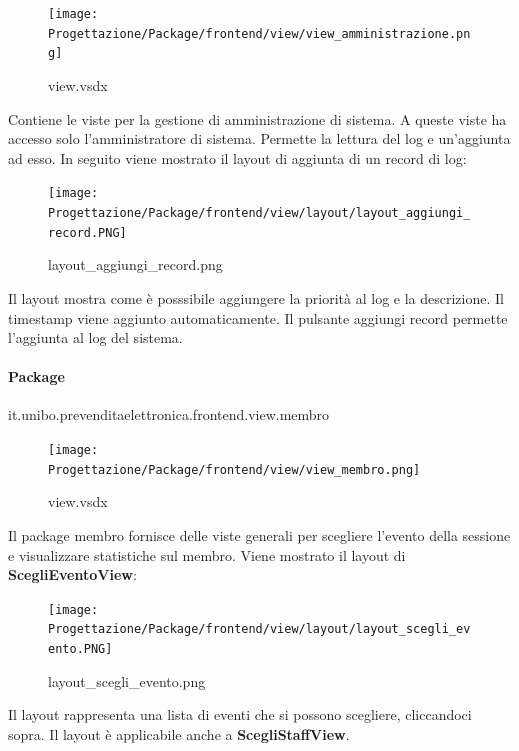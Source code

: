 \documentclass[a4paper]{article}
\begin{document}

\begin{figure}[H]
    \texttt{[image: Progettazione/Package/frontend/view/view\_amministrazione.png]}
    \centering
    \caption{view.vsdx}
\end{figure}

Contiene le viste per la gestione di amministrazione di sistema. A queste viste ha accesso solo l'amministratore di sistema. Permette la lettura del log e un'aggiunta ad esso. In seguito viene mostrato il layout di aggiunta di un record di log:

\begin{figure}[H]
    \texttt{[image: Progettazione/Package/frontend/view/layout/layout\_aggiungi\_record.PNG]}
    \centering
    \caption{layout\_aggiungi\_record.png}
\end{figure}

Il layout mostra come è posssibile aggiungere la priorità al log e la descrizione. Il timestamp viene aggiunto automaticamente. Il pulsante aggiungi record permette l'aggiunta al log del sistema.

\newpage

\paragraph{Package} it.unibo.prevenditaelettronica.frontend.view.membro


\begin{figure}[H]
    \texttt{[image: Progettazione/Package/frontend/view/view\_membro.png]}
    \centering
    \caption{view.vsdx}
\end{figure}

Il package membro fornisce delle viste generali per scegliere l'evento della sessione e visualizzare statistiche sul membro. Viene mostrato il layout di \textbf{ScegliEventoView}:

\begin{figure}[H]
    \texttt{[image: Progettazione/Package/frontend/view/layout/layout\_scegli\_evento.PNG]}
    \centering
    \caption{layout\_scegli\_evento.png}
\end{figure}

Il layout rappresenta una lista di eventi che si possono scegliere, cliccandoci sopra. Il layout è applicabile anche a \textbf{ScegliStaffView}.
\end{document}
